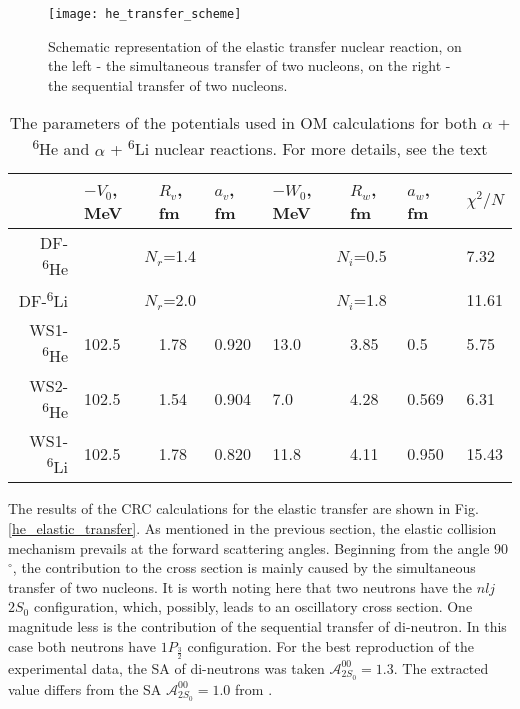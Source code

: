\documentclass[
12pt, %
oneside, %
english, %
onehalfspacing, %
onehalfspacing, %
headsepline, %
]{MastersDoctoralThesis} %
\newcommand{\he}{\textsuperscript{6}He\xspace}
\newcommand{\li}{\textsuperscript{6}Li\xspace}
\begin{document}
\begin{figure}[tp!]
\centering
\texttt{[image: he\_transfer\_scheme]}
\decoRule
\caption{  \footnotesize  Schematic representation of the elastic transfer nuclear reaction, on the left - the simultaneous transfer of two nucleons, on the right - the sequential transfer of two nucleons.
}
\label{he_transfer_scheme}
\end{figure}
\begin{table}[bp!]
\caption{\footnotesize The parameters of the potentials used in OM calculations for both $\alpha$ + \he and $\alpha$ + \li nuclear reactions. For more details, see the text}
\label{tab:he_elastic}
\begin{tabular*}{\textwidth}{@{\extracolsep{\fill}}rlllllll}
\hline
    & $-V_0$, MeV & $R_v$, fm & $a_v$, fm & $-W_0$, MeV & $R_w$, fm & $a_w$, fm & $\chi^2/N$ \\ \hline
DF-\he  & \multicolumn{3}{c}{$N_r$=1.4}        & \multicolumn{3}{c}{$N_i$=0.5}        & 7.32      \\
DF-\li  & \multicolumn{3}{c}{$N_r$=2.0}        & \multicolumn{3}{c}{$N_i$=1.8}        & 11.61      \\
WS1-\he & 102.5       & 1.78      & 0.920     & 13.0        & 3.85      & 0.5       & 5.75      \\
WS2-\he & 102.5       & 1.54      & 0.904     & 7.0         & 4.28      & 0.569     & 6.31      \\ 
WS1-\li & 102.5       & 1.78      & 0.820     & 11.8         & 4.11      & 0.950     & 15.43      \\
\hline
\end{tabular*}
\end{table}


The results of the CRC calculations for the elastic transfer are shown in Fig. \ref{he_elastic_transfer}.  
As mentioned in the previous section, the elastic collision mechanism prevails at the forward scattering angles. 
Beginning from the angle 90$^\circ$, the contribution to the cross section is mainly caused by the simultaneous transfer of two nucleons.
 It is worth noting here that two neutrons have the $nlj$ $2S_0$ configuration, which, possibly, leads to an oscillatory cross section. One magnitude less is the contribution of the sequential transfer of di-neutron. 
 In this case both neutrons have $1P_{\frac{3}{2}}$ configuration. 
 For the best reproduction of the experimental data, the SA of di-neutrons was taken  $\mathcal{A}^{00}_{2S_0}=1.3$. 
 The extracted value differs from the SA $\mathcal{A}^{00}_{2S_0}=1.0$ from \cite{khoa2004di, oganessian1999dynamics}.
\end{document}
